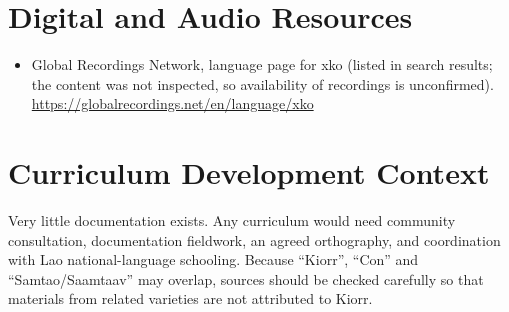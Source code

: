 \documentclass[12pt]{article}
\begin{document}
\section{Digital and Audio Resources}
\begin{itemize}
\item Global Recordings Network, language page for xko (listed in search results; the content was not inspected, so availability of recordings is unconfirmed). \url{https://globalrecordings.net/en/language/xko}
\end{itemize}

\section{Curriculum Development Context}
Very little documentation exists. Any curriculum would need community consultation, documentation fieldwork, an agreed orthography, and coordination with Lao national-language schooling. Because ``Kiorr'', ``Con'' and ``Samtao/Saamtaav'' may overlap, sources should be checked carefully so that materials from related varieties are not attributed to Kiorr.
\end{document}
